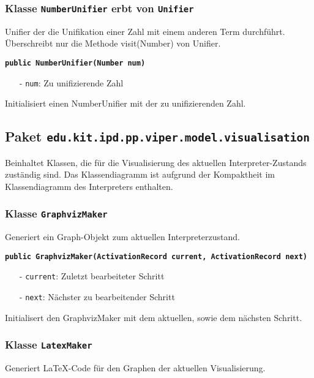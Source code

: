 \documentclass[parskip=full,11pt,twoside]{scrartcl}
\begin{document}
\subsubsection{Klasse \texttt{NumberUnifier} erbt von \texttt{Unifier}}

Unifier der die Unifikation einer Zahl mit einem anderen Term durchführt. Überschreibt nur die Methode visit(Number) von Unifier.

\textbf{\texttt{public NumberUnifier(Number num)}}
\begin{itemize}[noitemsep]
	\item[-] \texttt{num}: Zu unifizierende Zahl
\end{itemize}
Initialisiert einen NumberUnifier mit der zu unifizierenden Zahl.

\newpage
\subsection{Paket \texttt{edu.kit.ipd.pp.viper.model.visualisation}}

Beinhaltet Klassen, die für die Visualisierung des aktuellen Interpreter-Zustands zuständig sind. Das Klassendiagramm ist aufgrund der Kompaktheit im Klassendiagramm des Interpreters enthalten.

\subsubsection{Klasse \texttt{GraphvizMaker}}

Generiert ein Graph-Objekt zum aktuellen Interpreterzustand.

\textbf{\texttt{public GraphvizMaker(ActivationRecord current, ActivationRecord next)}}
\begin{itemize}[noitemsep]
	\item[-] \texttt{current}: Zuletzt bearbeiteter Schritt
    \item[-] \texttt{next}: Nächster zu bearbeitender Schritt
\end{itemize}
Initialisert den GraphvizMaker mit dem aktuellen, sowie dem nächsten Schritt.

\subsubsection{Klasse \texttt{LatexMaker}}

Generiert LaTeX-Code für den Graphen der aktuellen Visualisierung.
\end{document}
